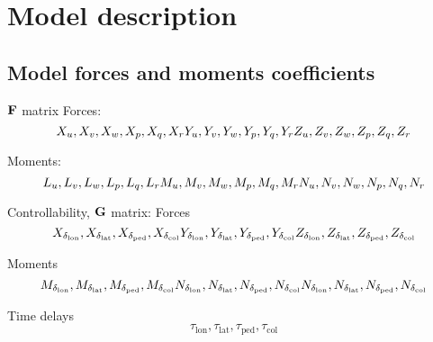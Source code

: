 \section{Model description}

\subsection{Model forces and moments coefficients}
$\mathrm{\textbf{F}}$ matrix
Forces: 
$$
X_u, X_v, X_w, X_p, X_q, X_r \\
Y_u, Y_v, Y_w, Y_p, Y_q, Y_r \\
Z_u, Z_v, Z_w, Z_p, Z_q, Z_r
$$

Moments:
$$
L_u, L_v, L_w, L_p, L_q, L_r \\
M_u, M_v, M_w, M_p, M_q, M_r \\
N_u, N_v, N_w, N_p, N_q, N_r
$$

Controllability, $\mathrm{\textbf{G}}$ matrix:
Forces
$$
X_{\delta_{\mathrm{lon}}}, X_{\delta_{\mathrm{lat}}}, X_{\delta_{\mathrm{ped}}}, X_{\delta_{\mathrm{col}}} \\
Y_{\delta_{\mathrm{lon}}}, Y_{\delta_{\mathrm{lat}}}, Y_{\delta_{\mathrm{ped}}}, Y_{\delta_{\mathrm{col}}} \\
Z_{\delta_{\mathrm{lon}}}, Z_{\delta_{\mathrm{lat}}}, Z_{\delta_{\mathrm{ped}}}, Z_{\delta_{\mathrm{col}}}
$$

Moments
$$
M_{\delta_{\mathrm{lon}}}, M_{\delta_{\mathrm{lat}}}, M_{\delta_{\mathrm{ped}}}, M_{\delta_{\mathrm{col}}} \\
N_{\delta_{\mathrm{lon}}}, N_{\delta_{\mathrm{lat}}}, N_{\delta_{\mathrm{ped}}}, N_{\delta_{\mathrm{col}}} \\
N_{\delta_{\mathrm{lon}}}, N_{\delta_{\mathrm{lat}}}, N_{\delta_{\mathrm{ped}}}, N_{\delta_{\mathrm{col}}}
$$

Time delays
$$
\tau_{\mathrm{lon}}, \tau_{\mathrm{lat}}, \tau_{\mathrm{ped}}, \tau_{\mathrm{col}}
$$